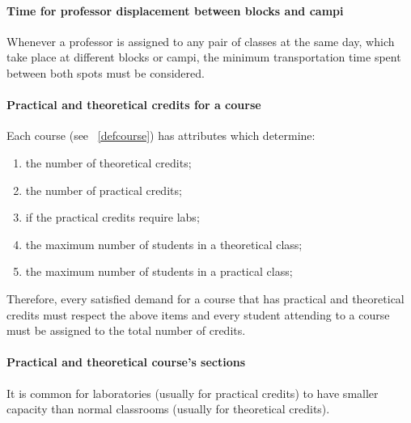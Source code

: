 \paragraph{Time for professor displacement between blocks and campi}
\label{constrprofdisplactime}

Whenever a professor is assigned to any pair of classes at the same day, which take place at different blocks or campi, the minimum transportation time spent between both spots must be considered.


\paragraph{Practical and theoretical credits for a course}
\label{constrptcourse}

Each course (see ~\ref{defcourse}) has attributes which determine:

\begin{enumerate}
\item the number of theoretical credits;
\item the number of practical credits;
\item if the practical credits require labs;
\item the maximum number of students in a theoretical class;
\item the maximum number of students in a practical class;
\end{enumerate}

Therefore, every satisfied demand for a course that has practical and theoretical credits must respect the above items and every student attending to a course must be assigned to the total number of credits.


\paragraph{Practical and theoretical course's sections}
\label{constrptrelation}

It is common for laboratories (usually for practical credits) to have smaller capacity than normal classrooms (usually for theoretical credits).

